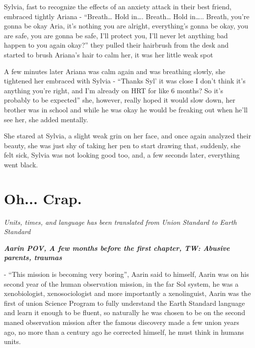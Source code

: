 \documentclass[hidelinks,12pt,a4paper]{book}
\begin{document}
Sylvia, fast to recognize the effects of an anxiety attack in their best friend, embraced tightly Ariana\newline
- “Breath… Hold in…. Breath… Hold in….. Breath, you're gonna be okay Aria, 
it's nothing you are alright, everything's gonna be okay, you are safe, you are gonna be safe, I'll protect you, 
I'll never let anything bad happen to you again okay?” they pulled their hairbrush from the desk and started to 
brush Ariana's hair to calm her, it was her little weak spot\par
\bigskip

A few minutes later Ariana was calm again and was breathing slowly, she tightened her embraced with Sylvia\newline
- “Thanks Syl' it was close I don't think it's anything you're right, and I'm already on HRT for like 
6 months? So it's probably to be expected” she, however, really hoped it would slow down, her brother 
was in school and while he was okay he would be freaking out when he'll see her, she added mentally.\par
\bigskip

She stared at Sylvia, a slight weak grin on her face, and once again analyzed their beauty,
 she was just shy of taking her pen to start drawing that, suddenly, she felt sick,
Sylvia was not looking good too, and, a few seconds later, everything went black.


\chapter{Oh... Crap.}

\textit{Units, times, and language has been translated from Union Standard to Earth Standard}\par
\textit{\textbf{Aarin POV, A few months before the first chapter, TW: Abusive parents, traumas}} \par
\bigskip
- “This mission is becoming very boring”, Aarin said to himself,
Aarin was on his second year of the human observation mission, in the far Sol system, 
he was a xenobiologist, xenosociologist and more importantly a xenolinguist, 
Aarin was the first of \gls{union} Science Program to fully understand the Earth Standard language and 
learn it enough to be fluent, so naturally he was chosen to be on the second maned observation mission after the 
famous discovery made a few union years ago, no more than a century ago he corrected himself, he must think in humans units.\par
\bigskip
\end{document}
